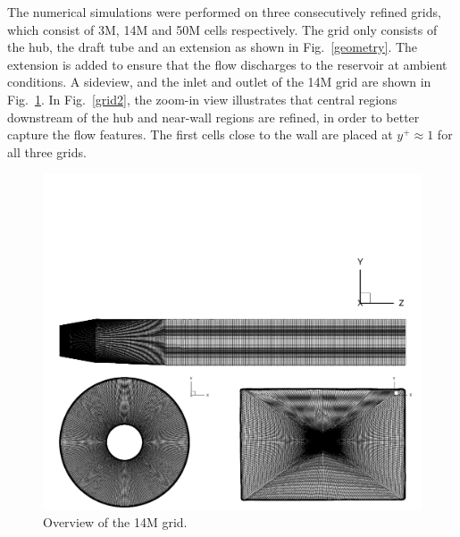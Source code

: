 The numerical simulations were performed on three consecutively refined grids, which consist of 3M, 14M and 50M cells respectively. The grid only consists of the hub, the draft tube and an extension as shown in Fig.~\ref{geometry}. The extension is added to ensure that the flow discharges to the reservoir at ambient conditions. A sideview, and the inlet and outlet of the 14M grid are shown in Fig.~\ref{grid1}. In Fig.~\ref{grid2}, the zoom-in view illustrates that central regions downstream of the hub and near-wall regions are refined, in order to better capture the flow features. The first cells close to the wall are placed at $y^{+}\approx 1$ for all three grids.
\begin{figure}[t]  
\centering
     \includegraphics[clip=true, trim= 0.0cm 0.0cm 0.0cm 8.0cm,width=0.99\linewidth]{./figures/bulbt/grid/overview}                            
     \caption{Overview of the 14M grid.}
     \label{grid1}
\end{figure}
